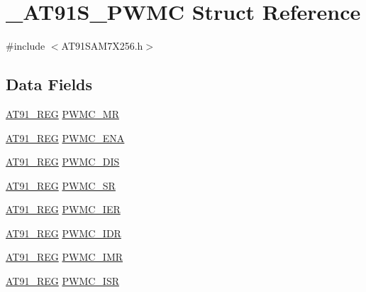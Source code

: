 \hypertarget{struct__AT91S__PWMC}{\section{\-\_\-\-A\-T91\-S\-\_\-\-P\-W\-M\-C Struct Reference}
\label{struct__AT91S__PWMC}
}


{\ttfamily \#include $<$A\-T91\-S\-A\-M7\-X256.\-h$>$}

\subsection*{Data Fields}
\begin{DoxyCompactItemize}
\item 
\hyperlink{GCC_2ARM7__AT91SAM7S_2AT91SAM7X256_8h_a712ad5a1ac1bd02f3e95a7526c283ce1}{A\-T91\-\_\-\-R\-E\-G} \hyperlink{struct__AT91S__PWMC_a9c0660954130a87462b9034dcea9ab75}{P\-W\-M\-C\-\_\-\-M\-R}
\item 
\hyperlink{GCC_2ARM7__AT91SAM7S_2AT91SAM7X256_8h_a712ad5a1ac1bd02f3e95a7526c283ce1}{A\-T91\-\_\-\-R\-E\-G} \hyperlink{struct__AT91S__PWMC_a0c9c6edf94968a23bfecf78872abe945}{P\-W\-M\-C\-\_\-\-E\-N\-A}
\item 
\hyperlink{GCC_2ARM7__AT91SAM7S_2AT91SAM7X256_8h_a712ad5a1ac1bd02f3e95a7526c283ce1}{A\-T91\-\_\-\-R\-E\-G} \hyperlink{struct__AT91S__PWMC_a88af22dd78f3a197f35ad398a80d7394}{P\-W\-M\-C\-\_\-\-D\-I\-S}
\item 
\hyperlink{GCC_2ARM7__AT91SAM7S_2AT91SAM7X256_8h_a712ad5a1ac1bd02f3e95a7526c283ce1}{A\-T91\-\_\-\-R\-E\-G} \hyperlink{struct__AT91S__PWMC_a517d41f2c73efb8ee4a9484992eaccfd}{P\-W\-M\-C\-\_\-\-S\-R}
\item 
\hyperlink{GCC_2ARM7__AT91SAM7S_2AT91SAM7X256_8h_a712ad5a1ac1bd02f3e95a7526c283ce1}{A\-T91\-\_\-\-R\-E\-G} \hyperlink{struct__AT91S__PWMC_a5262f70781ba8846d3c0cdf88af91379}{P\-W\-M\-C\-\_\-\-I\-E\-R}
\item 
\hyperlink{GCC_2ARM7__AT91SAM7S_2AT91SAM7X256_8h_a712ad5a1ac1bd02f3e95a7526c283ce1}{A\-T91\-\_\-\-R\-E\-G} \hyperlink{struct__AT91S__PWMC_a91998f2d7e11c486a62f413776f6ea47}{P\-W\-M\-C\-\_\-\-I\-D\-R}
\item 
\hyperlink{GCC_2ARM7__AT91SAM7S_2AT91SAM7X256_8h_a712ad5a1ac1bd02f3e95a7526c283ce1}{A\-T91\-\_\-\-R\-E\-G} \hyperlink{struct__AT91S__PWMC_ab648ff32d47dac368972f709a2c47758}{P\-W\-M\-C\-\_\-\-I\-M\-R}
\item 
\hyperlink{GCC_2ARM7__AT91SAM7S_2AT91SAM7X256_8h_a712ad5a1ac1bd02f3e95a7526c283ce1}{A\-T91\-\_\-\-R\-E\-G} \hyperlink{struct__AT91S__PWMC_a01fea47ca1fdeb2bf544efd5dc78f6cf}{P\-W\-M\-C\-\_\-\-I\-S\-R}

\end{DoxyCompactItemize}
